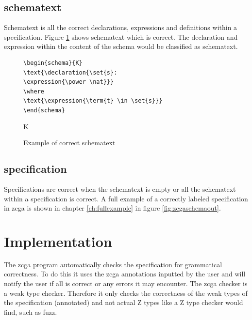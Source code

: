 \subsection{schematext}

Schematext is all the correct declarations, expressions and definitions within a
specification. Figure \ref{fig:stinzcga} shows schematext which is correct. The
declaration and expression within the content of the schema would be classified
as schematext.

\begin{figure}[H]
\centering
\begin{minipage}{0.45\textwidth}
\begin{BVerbatim}
\begin{schema}{K}
\text{\declaration{\set{s}:
\expression{\power \nat}}}
\where
\text{\expression{\term{t} \in \set{s}}}
\end{schema}
\end{BVerbatim}
\end{minipage}\hfill
\begin{minipage}{0.45\textwidth}
\begin{schema}{K}
\where
{}
\end{schema}
\end{minipage}
\caption{Example of correct schematext \label{fig:stinzcga}}
\end{figure}

\subsection{specification}

Specifications are correct when the schematext is empty or all the schematext
within a specification is correct. A full example of a correctly labeled
specification in \gls{zcga} is shown in chapter \ref{ch:fullexample} in figure
\ref{fig:zcgaschemaout}.

\section{Implementation}

The \gls{zcga} program automatically checks the specification for grammatical
correctness. To do this it uses the \gls{zcga} annotations inputted by the user
and will notify the user if all is correct or any errors it may encounter. The
\gls{zcga} checker is a weak type checker. Therefore it only checks the
correctness of the weak types of the specification (annotated) and not actual Z
types like a Z type checker would find, such as fuzz.


